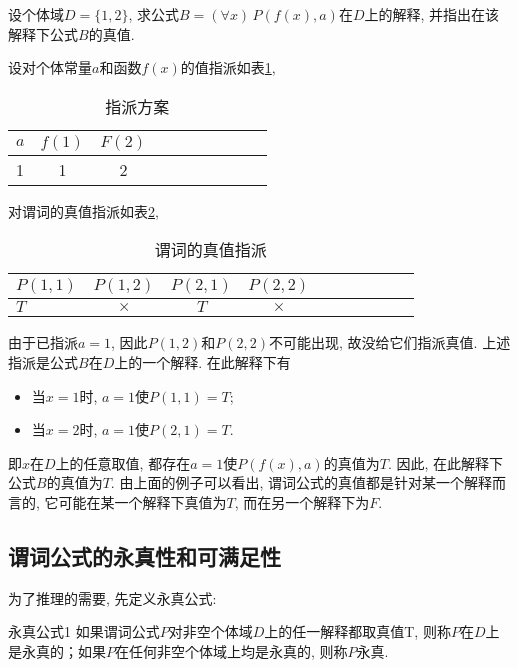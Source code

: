 \begin{example}
  设个体域$D=\{1, 2\}$, 求公式$B=(\forall x)\,P(f(x), a)$在$D$上的解释, 并指出在该解释下公式$B$的真值.
\end{example}
\begin{result}
设对个体常量$a$和函数$f(x)$的值指派如表\ref{AI_table2019113003},
\begin{table}[H]
\caption{指派方案}
\vspace{-0.6cm}
\begin{center}
\begin{tabular} {lccccccccc}
  \hline
$a$	&$f(1)$&$	F(2)$\\
\hline
1&	1	&2\\
\hline
\end{tabular}
\end{center}
\label{AI_table2019113003}
\end{table}
对谓词的真值指派如表\ref{AI_table2019113004},
\begin{table}[H]
\caption{谓词的真值指派}
\vspace{-0.6cm}
\begin{center}
\begin{tabular} {lccccccccc}
\hline
     $P(1,1)$&	  $P(1,2)$	&   $P(2,1)$&	   $P(2,2)$\\
\hline
     $T$	&   $\times$	&   $T$	&   $\times$	\\
\hline
\end{tabular}
\end{center}
\label{AI_table2019113004}
\end{table}
由于已指派$a=1$, 因此$P(1,2)$和$P(2,2)$不可能出现, 故没给它们指派真值.
上述指派是公式$B$在$D$上的一个解释. 在此解释下有
\begin{itemize}
\item 当$x=1$时, $a=1$使$P(1,1)=T$;
\item 当$x=2$时, $a=1$使$P(2,1)=T$.
\end{itemize}
即$x$在$D$上的任意取值, 都存在$a=1$使$P(f(x), a)$的真值为$T$. 因此, 在此解释下公式$B$的真值为$T$.
由上面的例子可以看出, 谓词公式的真值都是针对某一个解释而言的, 它可能在某一个解释下真值为$T$, 而在另一个解释下为$F$.
\end{result}

\subsection{谓词公式的永真性和可满足性}
 为了推理的需要, 先定义永真公式:
\begin{mydef}{永真公式}{1}
如果谓词公式$P$对非空个体域$D$上的任一解释都取真值T, 则称$P$在$D$上是永真的；如果$P$在任何非空个体域上均是永真的, 则称$P$永真.
\end{mydef}


